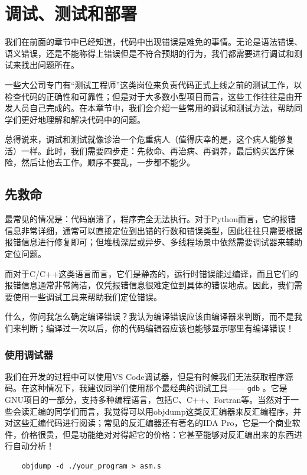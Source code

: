 \chapter{调试、测试和部署}\label{chap:debugging}

我们在前面的章节中已经知道，代码中出现错误是难免的事情。无论是语法错误、语义错误，还是不能称得上错误但是不符合预期的行为，我们都需要进行调试和测试来找出问题所在。

一些大公司专门有“测试工程师”这类岗位来负责代码正式上线之前的测试工作，以检查代码的正确性和可靠性；但是对于大多数小型项目而言，这些工作往往是由开发人员自己完成的。在本章节中，我们会介绍一些常用的调试和测试方法，帮助同学们更好地理解和解决代码中的问题。

总得说来，调试和测试就像诊治一个危重病人（值得庆幸的是，这个病人能够复活）一样。此时，我们需要四步走：先救命、再治病、再调养，最后购买医疗保险，然后让他去工作。顺序不要乱，一步都不能少。

\section{先救命}

最常见的情况是：代码崩溃了，程序完全无法执行。对于Python而言，它的报错信息非常详细，通常可以直接定位到出错的行数和错误类型，因此往往只需要根据报错信息进行修复即可；但堆栈深层或异步、多线程场景中依然需要调试器来辅助定位问题。

而对于C/C++这类语言而言，它们是静态的，运行时错误能过编译，而且它们的报错信息通常非常简洁，仅凭报错信息很难定位到具体的错误地点。因此，我们需要使用一些调试工具来帮助我们定位错误。

什么，你问我怎么确定编译错误？我认为编译错误应该由编译器来判断，而不是我们来判断；编译过一次以后，你的代码编辑器应该也能够显示哪里有编译错误！

\subsection{使用调试器}\label{sec:gdb}

我们在开发的过程中可以使用VS Code调试器，但是有时候我们无法获取程序源码。在这种情况下，我建议同学们使用那个最经典的调试工具—— \texttt{gdb} 。它是GNU项目的一部分，支持多种编程语言，包括C、C++、Fortran等。当然对于一些会读汇编的同学们而言，我觉得可以用objdump这类反汇编器来反汇编程序，并对这些汇编代码进行阅读；常见的反汇编器还有著名的IDA Pro，它是一个商业软件，价格很贵，但是功能绝对对得起它的价格：它甚至能够对反汇编出来的东西进行自动分析！
\begin{verbatim}
    objdump -d ./your_program > asm.s
\end{verbatim}

